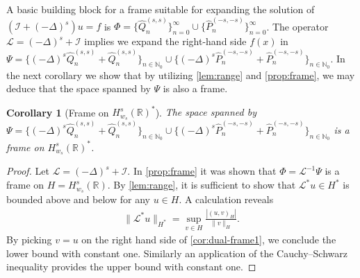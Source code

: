 \documentclass[10pt,a4paper]{article}
\newtheorem{corollary}{Corollary}[section]
\numberwithin{equation}{section}
\begin{document}
A basic building block for a frame suitable for expanding the solution of $(\mathcal{I} + (-\Delta)^s)u = f$ is $\Phi = \{\hat{Q}_n^{(s,s)}\}_{n=0}^\infty \cup \{\hat{P}_n^{(-s,-s)}\}_{n=0}^\infty$. The operator $\mathcal{L} = (-\Delta)^s + \mathcal{I}$ implies we expand the right-hand side $f(x)$ in  $\Psi =\{(-\Delta)^s \hat{Q}^{(s,s)}_n +  \hat{Q}^{(s,s)}_n \}_{n \in \mathbb{N}_0} \cup \{ (-\Delta)^s \hat{P}^{(-s,-s)}_n +  \hat{P}^{(-s,-s)}_n \}_{n \in \mathbb{N}_0}$. In the next corollary we show that by utilizing \cref{lem:range} and \cref{prop:frame}, we may deduce that the space spanned by $\Psi$ is also a frame.

\begin{corollary}[Frame on $H^s_{w_s}(\mathbb{R})^*$]
\label{cor:rhs-frame}
The space spanned by $\Psi =\{(-\Delta)^s \hat{Q}^{(s,s)}_n +  \hat{Q}^{(s,s)}_n \}_{n \in \mathbb{N}_0} \cup \{ (-\Delta)^s \hat{P}^{(-s,-s)}_n +  \hat{P}^{(-s,-s)}_n \}_{n \in \mathbb{N}_0}$ is a frame on $H^s_{w_s}(\mathbb{R})^*$.
\end{corollary} 
\begin{proof}
Let $\mathcal{L} = (-\Delta)^s + \mathcal{I}$. In \cref{prop:frame} it was shown that $\Phi = \mathcal{L}^{-1} \Psi$ is a frame on $H = H^s_{w_s}(\mathbb{R})$. By \cref{lem:range}, it is sufficient to show that  $\mathcal{L}^* u \in H^*$ is bounded above and below for any $u \in H$. A calculation reveals
\begin{align}
\| \mathcal{L}^* u \|_{H^*} = \sup_{v \in H} \frac{ | (u,v)_{H}|}{\| v\|_{H}}.
\label{cor:dual-frame1}
\end{align}
By picking $v = u$ on the right hand side of \cref{cor:dual-frame1}, we conclude the lower bound with constant one. Similarly an application of the Cauchy--Schwarz inequality provides the upper bound with constant one.
\end{proof} 
\end{document}
